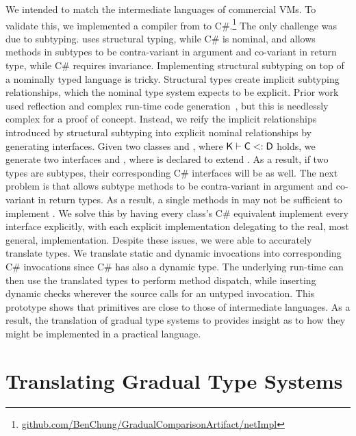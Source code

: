 \documentclass[USenglish]{tex/lipics-v2016}
\begin{document}
We intended \kafka to match the intermediate languages of commercial VMs.
To validate this, we implemented a compiler from \kafka to
C\#.\footnote{\small\url{github.com/BenChung/GradualComparisonArtifact/netImpl}}
The only challenge was due to subtyping. \kafka uses structural typing,
while C\# is nominal, and \kafka allows methods in subtypes to be
contra-variant in argument and co-variant in return type, while C\# requires
invariance.  Implementing structural subtyping on top of a nominally typed
language is tricky. Structural types create implicit subtyping
relationships, which the nominal type system expects to be explicit.  Prior
work used reflection and complex run-time code
generation~\cite{StructuralTypesOnJVM}, but this is needlessly complex for a
proof of concept.  Instead, we reify the implicit relationships introduced
by structural subtyping into explicit nominal relationships by generating
interfaces. Given two classes \C and \D, where $\K\vdash \C \Sub \D$ holds,
we generate two interfaces  and , where  is declared to
extend . As a result, if two types are subtypes, their corresponding
C\# interfaces will be as well.  The next problem is that \kafka allows
subtype methods to be contra-variant in argument and co-variant in return
types.  As a result, a single methods in  may not be sufficient to
implement .  We solve this by having every class's C\# equivalent
implement every interface explicitly, with each explicit implementation
delegating to the real, most general, implementation.  Despite these issues,
we were able to accurately translate \kafka types. We translate static and
dynamic invocations into corresponding C\# invocations since C\# has also a
dynamic type. The underlying run-time can then use the translated \kafka
types to perform method dispatch, while inserting dynamic checks wherever
the \kafka source calls for an untyped invocation. This prototype shows that
\kafka primitives are close to those of intermediate languages. As a result,
the translation of gradual type systems to \kafka provides insight as to how
they might be implemented in a practical language.

\section{Translating Gradual Type Systems}

\vspace{-4mm}
\end{document}
